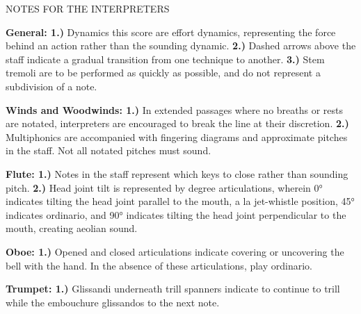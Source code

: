 \documentclass[11pt]{article}
\begin{document}
\vspace*{4\baselineskip}

\begingroup
\begin{center}
\huge NOTES FOR THE INTERPRETERS
\end{center}
\endgroup

\begingroup
\begin{center}
\textbf{General: 1.)} Dynamics this score are effort dynamics, representing the force behind an action rather than the sounding dynamic. \textbf{2.)} Dashed arrows above the staff indicate a gradual transition from one technique to another. \textbf{3.)}  Stem tremoli are to be performed as quickly as possible, and do not represent a subdivision of a note. \\
\rightskip\leftskip
\end{center}
\endgroup

\begingroup
\begin{center}
\textbf{Winds and Woodwinds: 1.)} In extended passages where no breaths or rests are notated, interpreters are encouraged to break the line at their discretion. \textbf{2.)} Multiphonics are accompanied with fingering diagrams and approximate pitches in the staff. Not all notated pitches must sound. \\
\rightskip\leftskip
\end{center}
\endgroup

\begingroup
\begin{center}
\textbf{Flute: 1.)} Notes in the staff represent which keys to close rather than sounding pitch. \textbf{2.)} Head joint tilt is represented by degree articulations, wherein 0° indicates tilting the head joint parallel to the mouth, a la jet-whistle position, 45° indicates ordinario, and 90° indicates tilting the head joint perpendicular to the mouth, creating aeolian sound. \\ 
\rightskip\leftskip
\end{center}
\endgroup

\begingroup
\begin{center}
\textbf{Oboe: 1.)} Opened and closed articulations indicate covering or uncovering the bell with the hand. In the absence of these articulations, play ordinario. \\
\rightskip\leftskip
\end{center}
\endgroup

\begingroup
\begin{center}
\textbf{Trumpet: 1.)} Glissandi underneath trill spanners indicate to continue to trill while the embouchure glissandos to the next note. \\
\rightskip\leftskip
\end{center}
\endgroup
\end{document}
